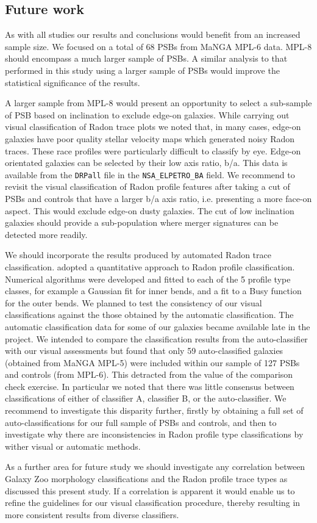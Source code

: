 \subsection{Future work}
\label{sec:future-work}
As with all studies our results and conclusions would benefit from an increased sample size. We focused on a total of 68 PSBs from MaNGA MPL-6 data. MPL-8 should encompass a much larger sample of PSBs. A similar analysis to that performed in this study using a larger sample of PSBs would improve the statistical significance of the results.

A larger sample from MPL-8  would present an opportunity to select a sub-sample of PSB based on inclination to exclude edge-on galaxies. While carrying out visual classification of Radon trace plots we noted that, in many cases, edge-on galaxies have poor quality stellar velocity maps which generated noisy Radon traces. These race profiles were particularly difficult to classify by eye. Edge-on orientated galaxies can be selected by their low axis ratio, b/a. This data is available from the \texttt{DRPall} file in the \texttt{NSA\_ELPETRO\_BA} field. We recommend to revisit the visual classification of Radon profile features after taking a cut of PSBs and controls that have a larger b/a axis ratio, i.e. presenting a  more face-on aspect. This would exclude edge-on dusty galaxies. The cut of low inclination galaxies should provide a sub-population where merger signatures can be detected more readily.

We should incorporate the results produced by automated Radon trace classification. \cite{2018MNRAS.480.2217S} adopted a quantitative approach to Radon profile classification. Numerical algorithms were developed and fitted to each of the 5 profile type classes, for example a Gaussian fit for inner bends, and a fit to a Busy function \citep{2014ascl.soft02015W} for the outer bends. We planned to test the consistency of our visual classifications against the those obtained by the automatic classification. The automatic classification data for some of our galaxies became available late in the project. We intended to compare the classification results from the auto-classifier with our visual assessments but found that only 59 auto-classified galaxies (obtained from MaNGA MPL-5) were included within our sample of 127 PSBs and controls (from MPL-6). This detracted from the value of the comparison check exercise. In particular we noted that there was little consensus between classifications of either of classifier A, classifier B, or the auto-classifier. We recommend to investigate this disparity further, firstly by obtaining a full set of auto-classifications for our full sample of PSBs and controls, and then to investigate why there are inconsistencies in Radon profile type classifications by wither visual or automatic methods. 

As a further area for future study we should investigate any correlation between Galaxy Zoo morphology classifications and the Radon profile trace types as discussed this present study. If a correlation is apparent it would enable us to refine the guidelines for our visual classification procedure, thereby resulting in more consistent results from diverse classifiers.